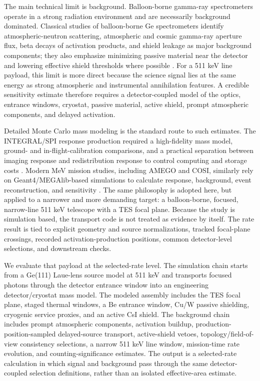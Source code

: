\documentclass[preprint,12pt]{elsarticle}
\begin{document}
The main technical limit is background. Balloon-borne gamma-ray spectrometers operate in a strong radiation environment and are necessarily background dominated. Classical studies of balloon-borne Ge spectrometers identify atmospheric-neutron scattering, atmospheric and cosmic gamma-ray aperture flux, beta decays of activation products, and shield leakage as major background components; they also emphasize minimizing passive material near the detector and lowering effective shield thresholds where possible \cite{Gehrels1985}. For a 511 keV line payload, this limit is more direct because the science signal lies at the same energy as strong atmospheric and instrumental annihilation features. A credible sensitivity estimate therefore requires a detector-coupled model of the optics, entrance windows, cryostat, passive material, active shield, prompt atmospheric components, and delayed activation.

Detailed Monte Carlo mass modeling is the standard route to such estimates. The INTEGRAL/SPI response production required a high-fidelity mass model, ground- and in-flight-calibration comparisons, and a practical separation between imaging response and redistribution response to control computing and storage costs \cite{Sturner2003}. Modern MeV mission studies, including AMEGO and COSI, similarly rely on Geant4/MEGAlib-based simulations to calculate response, background, event reconstruction, and sensitivity \cite{Agostinelli2003,Allison2016,Zoglauer2006,Caputo2017,Karwin2023,Gallego2025Balloon,Gallego2025,Beechert2022,Sleator2019,Ciabattoni2025ACS}. The same philosophy is adopted here, but applied to a narrower and more demanding target: a balloon-borne, focused, narrow-line 511 keV telescope with a TES focal plane. Because the study is simulation based, the transport code is not treated as evidence by itself. The rate result is tied to explicit geometry and source normalizations, tracked focal-plane crossings, recorded activation-production positions, common detector-level selections, and downstream checks.

We evaluate that payload at the selected-rate level. The simulation chain starts from a Ge(111) Laue-lens source model at 511 keV and transports focused photons through the detector entrance window into an engineering detector/cryostat mass model. The modeled assembly includes the TES focal plane, staged thermal windows, a Be entrance window, Cu/W passive shielding, cryogenic service proxies, and an active CsI shield. The background chain includes prompt atmospheric components, activation buildup, production-position-sampled delayed-source transport, active-shield vetoes, topology/field-of-view consistency selections, a narrow 511 keV line window, mission-time rate evolution, and counting-significance estimates. The output is a selected-rate calculation in which signal and background pass through the same detector-coupled selection definitions, rather than an isolated effective-area estimate.
\end{document}
